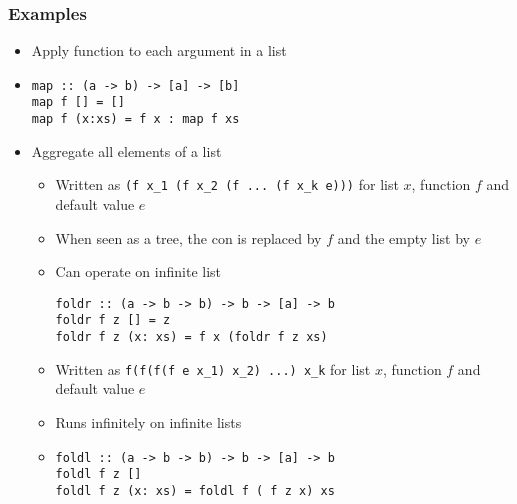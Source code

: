 \subsubsection{Examples}
\begin{itemize}
        \begin{itemize}
            \item Apply function to each argument in a list
            \item
\begin{verbatim}
map :: (a -> b) -> [a] -> [b]
map f [] = []
map f (x:xs) = f x : map f xs
\end{verbatim}
        \end{itemize}
        \begin{itemize}
            \item Aggregate all elements of a list
                \begin{itemize}
                    \item Written as \verb+(f x_1 (f x_2 (f ... (f x_k e)))+ for list $x$, function $f$ and default value $e$
                    \item When seen as a tree, the con is replaced by $f$ and the empty list by $e$
                    \item Can operate on infinite list
\begin{verbatim}
foldr :: (a -> b -> b) -> b -> [a] -> b
foldr f z [] = z
foldr f z (x: xs) = f x (foldr f z xs)
\end{verbatim}

                \end{itemize}
                \begin{itemize}
                    \item Written as \verb+f(f(f(f e x_1) x_2) ...) x_k+ for list $x$, function $f$ and default value $e$
                    \item Runs infinitely on infinite lists
                    \item
\begin{verbatim}
foldl :: (a -> b -> b) -> b -> [a] -> b
foldl f z []
foldl f z (x: xs) = foldl f ( f z x) xs
\end{verbatim}
                \end{itemize}
        \end{itemize}
\end{itemize}

